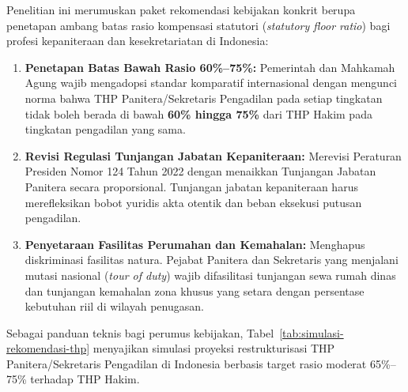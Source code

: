 \documentclass[12pt, a4paper]{article}
\begin{document}
Penelitian ini merumuskan paket rekomendasi kebijakan konkrit berupa penetapan ambang batas rasio kompensasi statutori (\textit{statutory floor ratio}) bagi profesi kepaniteraan dan kesekretariatan di Indonesia:
\begin{enumerate}
    \item \textbf{Penetapan Batas Bawah Rasio 60\%--75\%:} Pemerintah dan Mahkamah Agung wajib mengadopsi standar komparatif internasional dengan mengunci norma bahwa THP Panitera/Sekretaris Pengadilan pada setiap tingkatan tidak boleh berada di bawah \textbf{60\% hingga 75\%} dari THP Hakim pada tingkatan pengadilan yang sama.
    \item \textbf{Revisi Regulasi Tunjangan Jabatan Kepaniteraan:} Merevisi Peraturan Presiden Nomor 124 Tahun 2022 dengan menaikkan Tunjangan Jabatan Panitera secara proporsional. Tunjangan jabatan kepaniteraan harus merefleksikan bobot yuridis akta otentik dan beban eksekusi putusan pengadilan.
    \item \textbf{Penyetaraan Fasilitas Perumahan dan Kemahalan:} Menghapus diskriminasi fasilitas natura. Pejabat Panitera dan Sekretaris yang menjalani mutasi nasional (\textit{tour of duty}) wajib difasilitasi tunjangan sewa rumah dinas dan tunjangan kemahalan zona khusus yang setara dengan persentase kebutuhan riil di wilayah penugasan.
\end{enumerate}

Sebagai panduan teknis bagi perumus kebijakan, Tabel~\ref{tab:simulasi-rekomendasi-thp} menyajikan simulasi proyeksi restrukturisasi THP Panitera/Sekretaris Pengadilan di Indonesia berbasis target rasio moderat 65\%--75\% terhadap THP Hakim.
\end{document}
